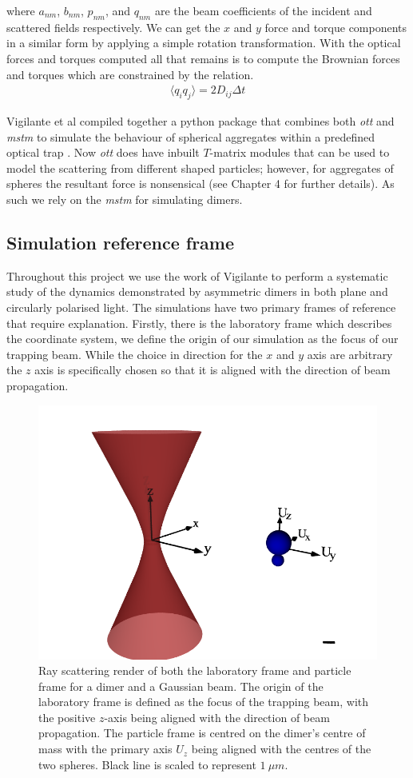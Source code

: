 where $a_{nm}$, $b_{nm}$, $p_{nm}$, and $q_{nm}$ are the beam 
coefficients of the incident and scattered fields respectively. 
We can get the $x$ and $y$ force and torque components in a 
similar form by applying a simple rotation transformation. With 
the optical forces and torques computed all that remains is to 
compute the Brownian forces and torques which are constrained 
by the relation.
\begin{align}
	\langle q_iq_j\rangle =2D_{ij}\Delta t
\end{align}

Vigilante et al compiled together a python package that combines 
both \textit{ott} and \textit{mstm} to simulate the behaviour of 
spherical aggregates within a predefined optical trap 
\cite{Vigilante2020}. Now \textit{ott} does have inbuilt $T$-matrix 
modules that can be used to model the scattering from different 
shaped particles; however, for aggregates of spheres the resultant 
force is nonsensical (see Chapter 4 for further details). As such 
we rely on the \textit{mstm} for simulating dimers.  

\subsection{Simulation reference frame}
\label{sec:sim_parameters}
Throughout this project we use the work of Vigilante \cite{Vigilante2020} 
to perform a systematic study of the dynamics demonstrated by 
asymmetric dimers in both plane and circularly polarised light. 
The simulations have two primary frames of reference that require 
explanation. Firstly, there is the laboratory frame which 
describes the coordinate system, we define the origin of our 
simulation as the focus of our trapping beam. While the choice in 
direction for the $x$ and $y$ axis are arbitrary the $z$ axis is 
specifically chosen so that it is aligned with the direction of 
beam propagation. 
\begin{figure}[h!]
	\centering
	\includegraphics[width=0.6\linewidth]{lab_frame.png}
	\caption{Ray scattering render of both the laboratory frame and 
		particle frame for a dimer and a Gaussian beam. The origin 
		of the laboratory frame is defined as the focus of the 
		trapping beam, with the positive $z$-axis being aligned with 
		the direction of beam propagation. The particle frame is 
		centred on the dimer's centre of mass with the primary axis 
		$U_z$ being aligned with the centres of the two spheres. Black 
		line is scaled to represent $1\ \mu m$.}
	\label{fig:lab_frame} 
\end{figure} 

